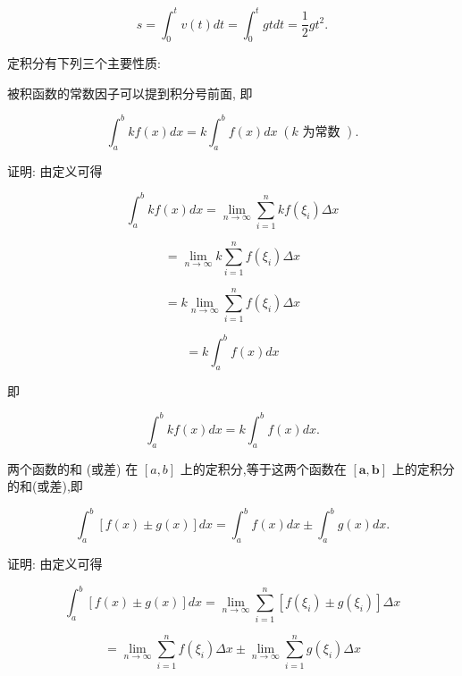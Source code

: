 \documentclass[lang=cn,newtx,10pt,scheme=chinese]{elegantbook}
\begin{document}
\[
s = {\int }_{0}^{t}v\left( t\right) {dt} = {\int }_{0}^{t}{gtdt} = \frac{1}{2}g{t}^{2}.
\]

定积分有下列三个主要性质:

\begin{proposition}[性质1]
被积函数的常数因子可以提到积分号前面, 即

\[
{\int }_{a}^{b}{kf}\left( x\right) {dx} = k{\int }_{a}^{b}f\left( x\right) {dx}\;\left( {k\text{ 为常数 }}\right) .
\]

\end{proposition}

证明: 由定义可得

\[
{\int }_{a}^{b}{kf}\left( x\right) {dx} = \mathop{\lim }\limits_{{n \rightarrow \infty }}\mathop{\sum }\limits_{{i = 1}}^{n}{kf}\left( {\xi }_{i}\right) {\Delta x}
\]

\[
= \mathop{\lim }\limits_{{n \rightarrow \infty }}k\mathop{\sum }\limits_{{i = 1}}^{n}f\left( {\xi }_{i}\right) {\Delta x}
\]

\[
= k\mathop{\lim }\limits_{{n \rightarrow \infty }}\mathop{\sum }\limits_{{i = 1}}^{n}f\left( {\xi }_{i}\right) {\Delta x}
\]

\[
= k{\int }_{a}^{b}f\left( x\right) {dx}
\]

即

\[
{\int }_{a}^{b}{kf}\left( x\right) {dx} = k{\int }_{a}^{b}f\left( x\right) {dx}.
\]

\begin{proposition}[性质2]

两个函数的和 (或差) 在 \(\left\lbrack {a,b}\right\rbrack\) 上的定积分,等于这两个函数在 \(\left\lbrack {\mathbf{a},\mathbf{b}}\right\rbrack\) 上的定积分的和(或差),即

\[
{\int }_{a}^{b}\left\lbrack {f\left( x\right) \pm g\left( x\right) }\right\rbrack {dx} = {\int }_{a}^{b}f\left( x\right) {dx} \pm {\int }_{a}^{b}g\left( x\right) {dx}.
\]

\end{proposition}

证明: 由定义可得

\[
{\int }_{a}^{b}\left\lbrack {f\left( x\right) \pm g\left( x\right) }\right\rbrack {dx} = \mathop{\lim }\limits_{{n \rightarrow \infty }}\mathop{\sum }\limits_{{i = 1}}^{n}\left\lbrack {f\left( {\xi }_{i}\right) \pm g\left( {\xi }_{i}\right) }\right\rbrack {\Delta x}
\]

\[
= \mathop{\lim }\limits_{{n \rightarrow \infty }}\mathop{\sum }\limits_{{i = 1}}^{n}f\left( {\xi }_{i}\right) {\Delta x} \pm \mathop{\lim }\limits_{{n \rightarrow \infty }}\mathop{\sum }\limits_{{i = 1}}^{n}g\left( {\xi }_{i}\right) {\Delta x}
\]
\end{document}
